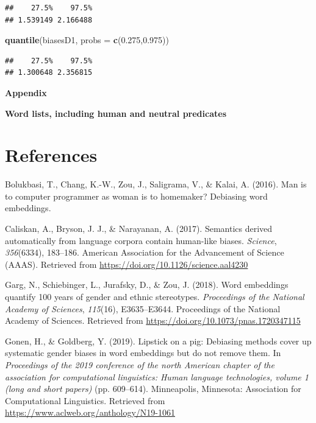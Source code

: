 \documentclass[10pt,dvipsnames,enabledeprecatedfontcommands]{scrartcl}
\newenvironment{Shaded}{\begin{snugshade}}{\end{snugshade}}
\newcommand{\KeywordTok}[1]{\textcolor[rgb]{0.13,0.29,0.53}{\textbf{#1}}}
\newcommand{\DataTypeTok}[1]{\textcolor[rgb]{0.13,0.29,0.53}{#1}}
\newcommand{\FloatTok}[1]{\textcolor[rgb]{0.00,0.00,0.81}{#1}}
\newcommand{\NormalTok}[1]{#1}
\begin{document}
\begin{verbatim}
##    27.5%    97.5% 
## 1.539149 2.166488
\end{verbatim}

\begin{Shaded}
\begin{Highlighting}[]
\KeywordTok{quantile}\NormalTok{(biasesD1, }\DataTypeTok{probs =} \KeywordTok{c}\NormalTok{(}\FloatTok{0.275}\NormalTok{,}\FloatTok{0.975}\NormalTok{))}
\end{Highlighting}
\end{Shaded}

\begin{verbatim}
##    27.5%    97.5% 
## 1.300648 2.356815
\end{verbatim}

\normalsize

\newpage

\noindent \huge  \textbf{Appendix} \normalsize

\noindent \Large \textbf{Word lists, including human and neutral predicates}
\normalsize

\section*{References}\label{references}

\vspace{-3mm}

\hypertarget{refs}{}
\hypertarget{ref-bolukbasi2016man}{}
Bolukbasi, T., Chang, K.-W., Zou, J., Saligrama, V., \& Kalai, A.
(2016). Man is to computer programmer as woman is to homemaker?
Debiasing word embeddings.

\hypertarget{ref-Caliskan2017semanticsBiases}{}
Caliskan, A., Bryson, J. J., \& Narayanan, A. (2017). Semantics derived
automatically from language corpora contain human-like biases.
\emph{Science}, \emph{356}(6334), 183--186. American Association for the
Advancement of Science (AAAS). Retrieved from
\url{https://doi.org/10.1126/science.aal4230}

\hypertarget{ref-Garg2018years}{}
Garg, N., Schiebinger, L., Jurafsky, D., \& Zou, J. (2018). Word
embeddings quantify 100 years of gender and ethnic stereotypes.
\emph{Proceedings of the National Academy of Sciences}, \emph{115}(16),
E3635--E3644. Proceedings of the National Academy of Sciences. Retrieved
from \url{https://doi.org/10.1073/pnas.1720347115}

\hypertarget{ref-Gonen2019lipstick}{}
Gonen, H., \& Goldberg, Y. (2019). Lipstick on a pig: Debiasing methods
cover up systematic gender biases in word embeddings but do not remove
them. In \emph{Proceedings of the 2019 conference of the north American
chapter of the association for computational linguistics: Human language
technologies, volume 1 (long and short papers)} (pp. 609--614).
Minneapolis, Minnesota: Association for Computational Linguistics.
Retrieved from \url{https://www.aclweb.org/anthology/N19-1061}
\end{document}

